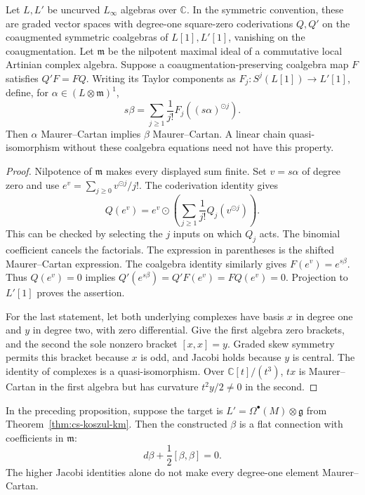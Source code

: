 \begin{proposition}
\label{thm:linf-mc-flatness}
Let $L,L'$ be uncurved $L_\infty$ algebras over $\mathbb C$.
In the symmetric convention, these are graded vector spaces with degree-one square-zero coderivations $Q,Q'$ on the coaugmented symmetric coalgebras of $L[1],L'[1]$, vanishing on the coaugmentation.
Let $\mathfrak m$ be the nilpotent maximal ideal of a commutative local Artinian complex algebra.
Suppose a coaugmentation-preserving coalgebra map $F$ satisfies $Q'F=FQ$.
Writing its Taylor components as $F_j:S^j(L[1])\to L'[1]$, define, for $\alpha\in(L\otimes\mathfrak m)^1$,
\[
 s\beta=\sum_{j\geq1}\frac1{j!}F_j((s\alpha)^{\odot j}).
\]
Then $\alpha$ Maurer--Cartan implies $\beta$ Maurer--Cartan.
A linear chain quasi-isomorphism without these coalgebra equations need not have this property.
\end{proposition}

\begin{proof}
Nilpotence of $\mathfrak m$ makes every displayed sum finite.
Set $v=s\alpha$ of degree zero and use
$e^v=\sum_{j\geq0}v^{\odot j}/j!$.
The coderivation identity gives
\[
 Q(e^v)=e^v\odot\left(\sum_{j\geq1}\frac1{j!}Q_j(v^{\odot j})\right).
\]
This can be checked by selecting the $j$ inputs on which $Q_j$ acts.
The binomial coefficient cancels the factorials.
The expression in parentheses is the shifted Maurer--Cartan expression.
The coalgebra identity similarly gives $F(e^v)=e^{s\beta}$.
Thus $Q(e^v)=0$ implies
$Q'(e^{s\beta})=Q'F(e^v)=FQ(e^v)=0$.
Projection to $L'[1]$ proves the assertion.

For the last statement, let both underlying complexes have basis $x$ in degree one and $y$ in degree two, with zero differential.
Give the first algebra zero brackets, and the second the sole nonzero bracket $[x,x]=y$.
Graded skew symmetry permits this bracket because $x$ is odd, and Jacobi holds because $y$ is central.
The identity of complexes is a quasi-isomorphism.
Over $\mathbb C[t]/(t^3)$, $tx$ is Maurer--Cartan in the first algebra but has curvature $t^2y/2\ne0$ in the second.
\end{proof}

\begin{corollary}
\label{thm:cs-koszul-general}
In the preceding proposition, suppose the target is
$L'=\Omega^\bullet(M)\otimes\mathfrak g$ from Theorem~\ref{thm:cs-koszul-km}.
Then the constructed $\beta$ is a flat connection with coefficients in $\mathfrak m$:
\begin{equation}\label{eq:deformed-cs-general}
 d\beta+\frac12[\beta,\beta]=0.
\end{equation}
The higher Jacobi identities alone do not make every degree-one element Maurer--Cartan.
\end{corollary}

